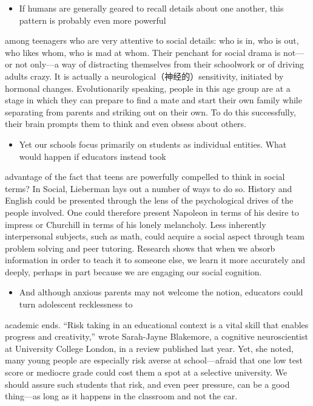 \documentclass[UTF8,11pt]{ctexart}
\begin{document}
\begin{itemize}[leftmargin=2em,itemsep=.2em,topsep=.4em]\item[J.] If humans are generally geared to recall details about one another, this pattern is probably even more powerful
\end{itemize}

among teenagers who are very attentive to social details: who is in, who is out, who likes whom, who is mad at whom. Their penchant for social drama is not—or not only—a way of distracting themselves from their schoolwork or of driving adults crazy. It is actually a neurological（神经的）sensitivity, initiated by hormonal changes. Evolutionarily speaking, people in this age group are at a stage in which they can prepare to find a mate and start their own family while separating from parents and striking out on their own. To do this successfully, their brain prompts them to think and even obsess about others.


\begin{itemize}[leftmargin=2em,itemsep=.2em,topsep=.4em]\item[K.] Yet our schools focus primarily on students as individual entities. What would happen if educators instead took
\end{itemize}

advantage of the fact that teens are powerfully compelled to think in social terms? In Social, Lieberman lays out a number of ways to do so. History and English could be presented through the lens of the psychological drives of the people involved. One could therefore present Napoleon in terms of his desire to impress or Churchill in terms of his lonely melancholy. Less inherently interpersonal subjects, such as math, could acquire a social aspect through team problem solving and peer tutoring. Research shows that when we absorb information in order to teach it to someone else, we learn it more accurately and deeply, perhaps in part because we are engaging our social cognition.


\begin{itemize}[leftmargin=2em,itemsep=.2em,topsep=.4em]\item[L.] And although anxious parents may not welcome the notion, educators could turn adolescent recklessness to
\end{itemize}

academic ends. “Risk taking in an educational context is a vital skill that enables progress and creativity,” wrote Sarah-Jayne Blakemore, a cognitive neuroscientist at University College London, in a review published last year. Yet, she noted, many young people are especially risk averse at school—afraid that one low test score or mediocre grade could cost them a spot at a selective university. We should assure such students that risk, and even peer pressure, can be a good thing—as long as it happens in the classroom and not the car.
\end{document}
